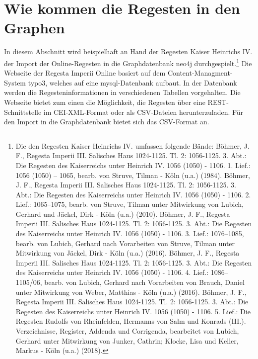 \documentclass[ngerman,]{scrreprt}
\begin{document}
\section{Wie kommen die Regesten in den Graphen}\label{wie-kommen-die-regesten-in-den-graphen}

In diesem Abschnitt wird beispielhaft an Hand der Regesten Kaiser Heinrichs IV. der Import der Online-Regesten in die Graphdatenbank neo4j durchgespielt.\footnote{Die den Regesten Kaiser Heinrichs IV. umfassen folgende Bände: Böhmer, J. F., Regesta Imperii III. Salisches Haus 1024-1125. Tl. 2: 1056-1125. 3. Abt.: Die Regesten des Kaiserreichs unter Heinrich IV. 1056 (1050) - 1106. 1. Lief.: 1056 (1050) -- 1065, bearb. von Struve, Tilman - Köln (u.a.) (1984). Böhmer, J. F., Regesta Imperii III. Salisches Haus 1024-1125. Tl. 2: 1056-1125. 3. Abt.: Die Regesten des Kaiserreichs unter Heinrich IV. 1056 (1050) - 1106. 2. Lief.: 1065--1075, bearb. von Struve, Tilman unter Mitwirkung von Lubich, Gerhard und Jäckel, Dirk - Köln (u.a.) (2010). Böhmer, J. F., Regesta Imperii III. Salisches Haus 1024-1125. Tl. 2: 1056-1125. 3. Abt.: Die Regesten des Kaiserreichs unter Heinrich IV. 1056 (1050) - 1106. 3. Lief.: 1076--1085, bearb. von Lubich, Gerhard nach Vorarbeiten von Struve, Tilman unter Mitwirkung von Jäckel, Dirk - Köln (u.a.) (2016). Böhmer, J. F., Regesta Imperii III. Salisches Haus 1024-1125. Tl. 2: 1056-1125. 3. Abt.: Die Regesten des Kaiserreichs unter Heinrich IV. 1056 (1050) - 1106. 4. Lief.: 1086--1105/06, bearb. von Lubich, Gerhard nach Vorarbeiten von Brauch, Daniel unter Mitwirkung von Weber, Matthias - Köln (u.a.) (2016). Böhmer, J. F., Regesta Imperii III. Salisches Haus 1024-1125. Tl. 2: 1056-1125. 3. Abt.: Die Regesten des Kaiserreichs unter Heinrich IV. 1056 (1050) - 1106. 5. Lief.: Die Regesten Rudolfs von Rheinfelden, Hermanns von Salm und Konrads (III.). Verzeichnisse, Register, Addenda und Corrigenda, bearbeitet von Lubich, Gerhard unter Mitwirkung von Junker, Cathrin; Klocke, Lisa und Keller, Markus - Köln (u.a.) (2018).} Die Webseite der Regesta Imperii Online basiert auf dem Content-Managment-System typo3, welches auf eine mysql-Datenbank aufbaut. In der Datenbank werden die Regesteninformationen in verschiedenen Tabellen vorgehalten. Die Webseite bietet zum einen die Möglichkeit, die Regesten über eine REST-Schnittstelle im CEI-XML-Format oder als CSV-Dateien herunterzuladen. Für den Import in die Graphdatenbank bietet sich das CSV-Format an.
\end{document}

